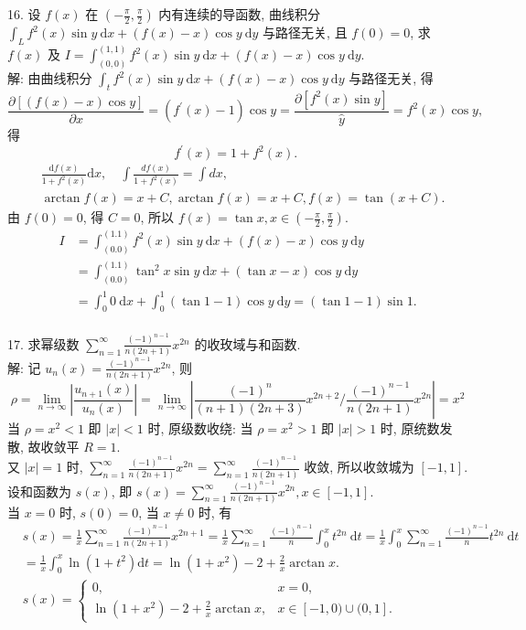 \documentclass[a4paper,11pt,UTF8]{article}
\begin{document}
16. 设 $f(x)$ 在 $\left(-\frac{\pi}{2}, \frac{\pi}{2}\right)$ 内有连续的导函数, 曲线积分 $\int_L f^2(x) \sin y \mathrm{~d} x+(f(x)-x) \cos y \mathrm{~d} y$ 与路径无关, 且 $f(0)=0$, 求 $f(x)$ 及 $I=\int_{(0,0)}^{(1,1)} f^2(x) \sin y \mathrm{~d} x+(f(x)-x) \cos y \mathrm{~d} y$.\\
解: 由曲线积分 $\int_t f^2(x) \sin y \mathrm{~d} x+(f(x)-x) \cos y \mathrm{~d} y$ 与路径无关, 得
$$
\frac{\partial[(f(x)-x) \cos y]}{\partial x}=\left(f^{\prime}(x)-1\right) \cos y=\frac{\partial\left[f^2(x) \sin y\right]}{\hat{y}}=f^2(x) \cos y,
$$
得
$$
f^{\prime}(x)=1+f^2(x) \text {. }
$$
$$
\begin{aligned}
	& \frac{\mathrm{d} f(x)}{1+f^2(x)} \mathrm{d} x, \quad \int \frac{d f(x)}{1+f^2(x)}=\int d x, \\
	& \arctan f(x)=x+C, \arctan f(x)=x+C, f(x)=\tan (x+C) .
\end{aligned}
$$
由 $f(0)=0$, 得 $C=0$, 所以 $f(x)=\tan x, x \in\left(-\frac{\pi}{2}, \frac{\pi}{2}\right)$.
$$
\begin{aligned}
	I & =\int_{(0.0)}^{(1.1)} f^2(x) \sin y \mathrm{~d} x+(f(x)-x) \cos y \mathrm{~d} y \\
	& =\int_{(0.0)}^{(1.1)} \tan ^2 x \sin y \mathrm{~d} x+(\tan x-x) \cos y \mathrm{~d} y \\
	& =\int_0^1 0 \mathrm{~d} x+\int_0^1(\tan 1-1) \cos y \mathrm{~d} y=(\tan 1-1) \sin 1 .
\end{aligned}
$$\\
17. 求幂级数 $\sum_{n=1}^{\infty} \frac{(-1)^{n-1}}{n(2 n+1)} x^{2 n}$ 的收玫域与和函数.\\
解: 记 $u_n(x)=\frac{(-1)^{n-1}}{n(2 n+1)} x^{2 n}$, 则
$$
\rho=\lim _{n \rightarrow \infty}\left|\frac{u_{n+1}(x)}{u_n(x)}\right|=\lim _{n \rightarrow \infty}\left|\frac{(-1)^n}{(n+1)(2 n+3)} x^{2 n+2} / \frac{(-1)^{n-1}}{n(2 n+1)} x^{2 n}\right|=x^2
$$
当 $\rho=x^2<1$ 即 $|x|<1$ 时, 原级数收绕: 当 $\rho=x^2>1$ 即 $|x|>1$ 时, 原统数发散, 故收敛平 $R=1$.\\
又 $|x|=1$ 时, $\sum_{n=1}^{\infty} \frac{(-1)^{n-1}}{n(2 n+1)} x^{2 n}=\sum_{n=1}^{\infty} \frac{(-1)^{n-1}}{n(2 n+1)}$ 收敛, 所以收敛城为 $[-1,1]$.\\
设和函数为 $s(x)$, 即 $s(x)=\sum_{n=1}^{\infty} \frac{(-1)^{n-1}}{n(2 n+1)} x^{2 n}, x \in[-1,1]$.\\
当 $x=0$ 时, $s(0)=0$, 当 $x \neq 0$ 时, 有
$$
\begin{aligned}
	& s(x)=\frac{1}{x} \sum_{n=1}^{\infty} \frac{(-1)^{n-1}}{n(2 n+1)} x^{2 n+1}=\frac{1}{x} \sum_{n=1}^{\infty} \frac{(-1)^{n-1}}{n} \int_0^x t^{2 n} \mathrm{~d} t=\frac{1}{x} \int_0^x \sum_{n=1}^{\infty} \frac{(-1)^{n-1}}{n} t^{2 n} \mathrm{~d} t \\
	& =\frac{1}{x} \int_0^x \ln \left(1+t^2\right) \mathrm{d} t=\ln \left(1+x^2\right)-2+\frac{2}{x} \arctan x . \\
	& s(x)= \begin{cases}0, & x=0, \\
		\ln \left(1+x^2\right)-2+\frac{2}{x} \arctan x, & x \in[-1,0) \cup(0,1] .\end{cases} \\
	&
\end{aligned}
$$\\
\end{document}

